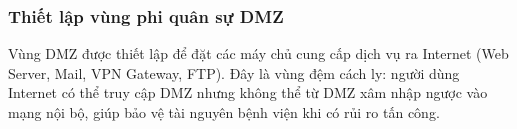 




\subsubsection{Thiết lập vùng phi quân sự DMZ}
Vùng DMZ được thiết lập để đặt các máy chủ cung cấp dịch vụ ra Internet (Web Server, Mail, VPN Gateway, FTP). Đây là vùng đệm cách ly: người dùng Internet có thể truy cập DMZ nhưng không thể từ DMZ xâm nhập ngược vào mạng nội bộ, giúp bảo vệ tài nguyên bệnh viện khi có rủi ro tấn công.

